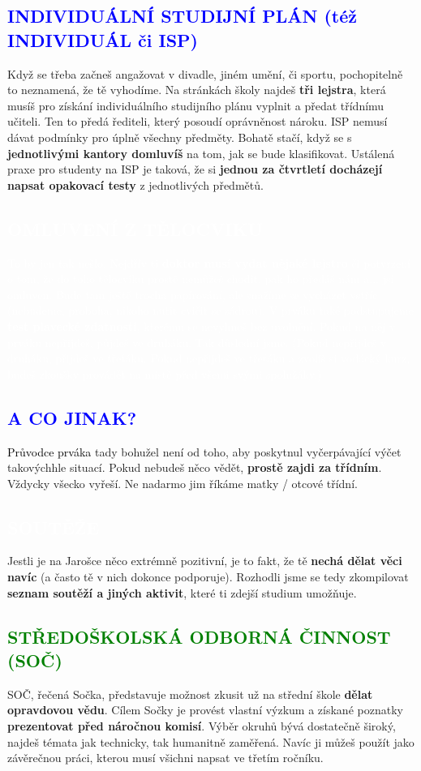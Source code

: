 \documentclass[a5paper, twoside]{article}
\newcommand{\nadpis}[4]{
  \vspace*{-50pt}
  \begin{tcolorbox}[colback = #2, boxrule = 0pt, grow to left by = #4,  grow to right by = #4, arc=8pt, height = 40pt]
    \vspace*{5pt}
    \centering \section*{\textcolor{#3}{#1}}
  \end{tcolorbox}
}
\newcommand{\podnadpis}[2]{
  \subsection*{\textcolor{#2}{#1}}
}
\begin{document}
\podnadpis{INDIVIDUÁLNÍ STUDIJNÍ PLÁN (též INDIVIDUÁL či ISP)}{blue}
Když se třeba začneš angažovat v divadle, jiném umění, či sportu, pochopitelně to neznamená, že tě vyhodíme. Na stránkách školy najdeš \textbf{tři lejstra}, která musíš pro získání individuálního studijního plánu vyplnit a předat třídnímu učiteli. Ten to předá řediteli, který posoudí oprávněnost nároku.
ISP nemusí dávat podmínky pro úplně všechny předměty. Bohatě stačí, když se
s \textbf{jednotlivými kantory domluvíš} na tom, jak se bude klasifikovat. Ustálená praxe pro studenty na ISP je taková, že si \textbf{jednou za čtvrtletí docházejí napsat opakovací testy} z jednotlivých předmětů.

\begin{bluebox}
  \vspace*{-8pt}
	\textcolor{white}{\subsection*{OMLUVENÍ Z TĚLOCVIKU}
		To by jen tak nešlo. Nejdřív ti \textbf{doktor musí vydat nějaké lejstro} či potvrzení o tom, že do toho tělocviku prostě nemůžeš chodit, pak ho předáš nám a... jsi omluven. Bude tam ještě trocha papírování, ale snažíme se vycházet vstříc (nebudeme, proboha, nikoho nutit cvičit se sádrou). V prváku také podstupujeme \textbf{test plavecké zdatnosti}, kterému se nevyhneš bez uvolnění. Pokud na něj v prváku nepřijdeš, půjdeš ve druháku. Tak důslední jsme. (Pokud nepřijdeš v druháku, přijdeš ve třeťáku. Pokud nepřijdeš ve třeťáku a zvolíš si vodácký kurz, budeš zkoušky provádět na místě před všemi svými spolužáky.)
	}
\end{bluebox}

\podnadpis{A CO JINAK?}{blue}
\textcolor{black}{\Kapitan Průvodce prváka} tady bohužel není od toho, aby poskytnul vyčerpávající výčet takovýchhle situací. Pokud nebudeš něco vědět, \textbf{prostě zajdi za třídním}. Vždycky všecko vyřeší. Ne nadarmo jim říkáme matky / otcové třídní.

\newpage

\nadpis{SOUTĚŽE}{green}{white}{-4.7cm}

\noindent Jestli je na Jarošce něco extrémně pozitivní, je to fakt, že tě \textbf{nechá dělat věci navíc} (a často tě v nich dokonce podporuje). Rozhodli jsme se tedy zkompilovat \textbf{seznam soutěží a jiných aktivit}, které ti zdejší studium umožňuje.

\podnadpis{STŘEDOŠKOLSKÁ ODBORNÁ ČINNOST (SOČ)}{green}
SOČ, řečená Sočka, představuje možnost zkusit už na střední škole \textbf{dělat opravdovou vědu}. Cílem Sočky je provést vlastní výzkum a získané poznatky \textbf{prezentovat před náročnou komisí}. Výběr okruhů bývá dostatečně široký, najdeš témata jak technicky, tak humanitně zaměřená. Navíc ji můžeš použít jako závěrečnou práci, kterou musí všichni napsat ve třetím ročníku.
\end{document}
